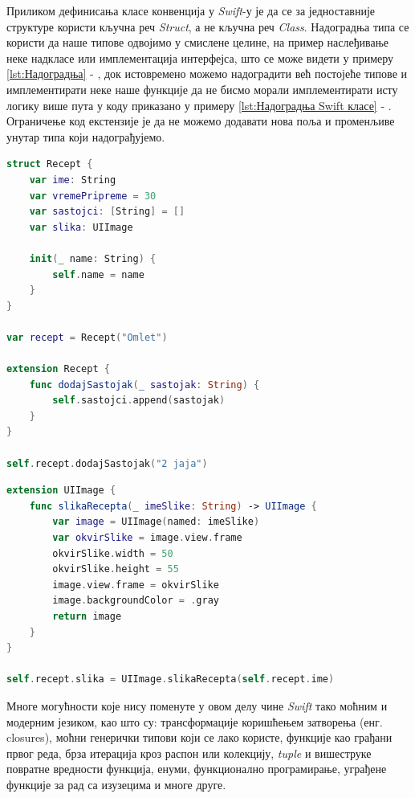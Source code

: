 \documentclass[12pt,oneside]{memoir}
\begin{document}
\indent Приликом дефинисања класе конвенција у \textit{Swift}-у је да се за једноставније структуре користи кључна реч \textit{Struct}, а не кључна реч \textit{Class}. Надоградња типа се користи да наше типове одвојимо у смислене целине, на пример наслеђивање неке надкласе или имплементација интерфејса, што се може видети у примеру \ref{lst:Надоградња} - , док истовремено можемо надоградити већ постојеће типове и имплементирати неке наше функције да не бисмо морали имплементирати исту логику више пута у коду приказано у примеру \ref{lst:Надоградња Swift класе} - . Ограничење код екстензије је да не можемо додавати нова поља и променљиве унутар типа који надограђујемо.

\begin{lstlisting}[caption=\textit{{Надоградња постојећег типа (класе, структуре)}}, label={lst:Надоградња}, language=Swift, frame=single]
struct Recept {
    var ime: String
    var vremePripreme = 30
    var sastojci: [String] = []
    var slika: UIImage

    init(_ name: String) {
        self.name = name
    }
}

var recept = Recept("Omlet")

extension Recept {
    func dodajSastojak(_ sastojak: String) {
        self.sastojci.append(sastojak)
    }
}

self.recept.dodajSastojak("2 jaja")
\end{lstlisting}

\begin{lstlisting}[caption=\textit{{Надоградња Swift класе}}, label={lst:Надоградња Swift класе}, language=Swift, frame=single]
extension UIImage {
    func slikaRecepta(_ imeSlike: String) -> UIImage {
        var image = UIImage(named: imeSlike)
        var okvirSlike = image.view.frame
        okvirSlike.width = 50
        okvirSlike.height = 55
        image.view.frame = okvirSlike
        image.backgroundColor = .gray
        return image
    }
}

self.recept.slika = UIImage.slikaRecepta(self.recept.ime)
\end{lstlisting}

\indent Многе могућности које нису поменуте у овом делу чине \textit{Swift} тако моћним и модерним језиком, као што су: трансформације коришћењем затворења (енг. closures), моћни генерички типови који се лако користе, функције као грађани првог реда, брза итерација кроз распон или колекцију, \textit{tuple} и вишеструке повратне вредности функција, енуми, функционално програмирање, уграђене функције за рад са изузецима и многе друге.
\end{document}

